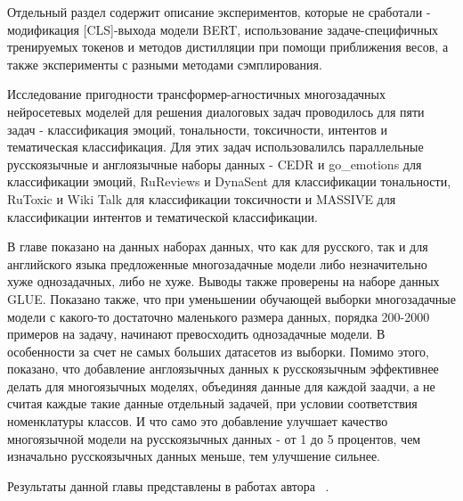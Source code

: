 Отдельный раздел содержит описание экспериментов, которые не сработали - модификация [CLS]-выхода модели BERT, использование задаче-специфичных тренируемых токенов и методов дистилляции при помощи приближения весов, а также эксперименты с разными методами сэмплирования. 

Исследование пригодности трансформер-агностичных многозадачных нейросетевых моделей для решения диалоговых задач проводилось для пяти задач - классификация эмоций, тональности, токсичности, интентов и тематическая классификация. Для этих задач использовалилсь параллельные русскоязычные и англоязычные наборы данных - CEDR и go\_emotions для классификации эмоций, RuReviews и DynaSent для классификации тональности, RuToxic и Wiki Talk для классификации токсичности и MASSIVE для классификации интентов и тематической классификации.

В главе показано на данных наборах данных, что как для русского, так и для английского языка предложенные многозадачные модели либо незначительно хуже однозадачных, либо не хуже. Выводы также проверены на наборе данных GLUE. Показано также, что при уменьшении обучающей выборки многозадачные модели с какого-то достаточно маленького размера данных, порядка 200-2000 примеров на задачу, начинают превосходить однозадачные модели. В особенности за счет не самых больших датасетов из выборки. Помимо этого, показано, что добавление англоязычных данных к русскоязычным эффективнее делать для многоязычных моделях, объединяя данные для каждой заадчи, а не считая каждые такие данные отдельный задачей, при условии соответствия номенклатуры классов. И что само это добавление улучшает качество многоязычной модели на русскоязычных данных - от 1 до 5 процентов, чем изначально русскоязычных данных меньше, тем улучшение сильнее.


Результаты данной главы представлены в работах автора ~\cite{rumtl,enmtl}.

